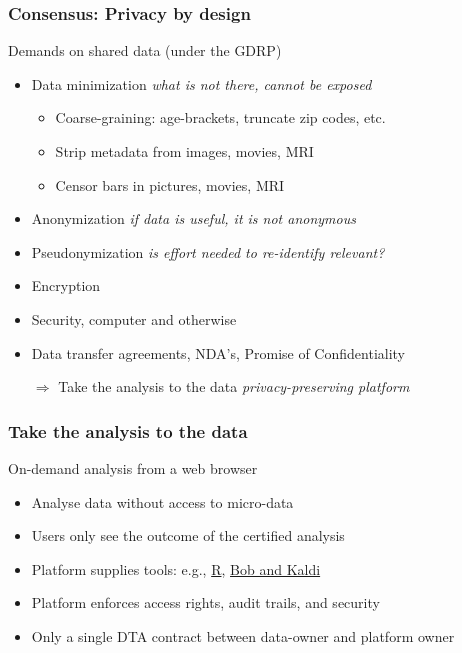 \documentclass[xcolor=dvipsnames]{beamer}
\begin{document}
\begin{frame}
	\frametitle{Consensus: Privacy by design}
	
	\begin{block}{Demands on shared data (under the GDRP)}
	\begin{itemize}
	\item Data minimization {\hspace{2cm} \small \em what is not there, cannot be exposed}
	\begin{itemize}
	\item Coarse-graining: age-brackets, truncate zip codes, etc.
	\item Strip metadata from images, movies, MRI
	\item Censor bars in pictures, movies, MRI 
	\end{itemize}
	\item Anonymization {\hspace{2.6cm} \small \em if data is useful, it is not anonymous}
	\item Pseudonymization {\hspace{2cm} \small \em is effort needed to re-identify relevant?}
	\item Encryption
	\item Security, computer and otherwise
	\item Data transfer agreements, NDA's, Promise of Confidentiality
	\item[$\Rightarrow$] {\color{Maroon}Take the analysis to the data} {\hspace{2cm} \small \em privacy-preserving platform}
	\end{itemize}
	\end{block}	

\end{frame}

\begin{frame}
	\frametitle{Take the analysis to the data}
	
	\begin{block}{On-demand analysis from a web browser}
	\begin{itemize}
	\item Analyse data without access to micro-data
	\item Users only see the outcome of the certified analysis
	\item Platform supplies tools: e.g., \href{https://www.ncbi.nlm.nih.gov/pmc/articles/PMC4276062/}{\color{blue} R}, \href{http://publications.idiap.ch/downloads/papers/2017/Cernak_INTERSPEECH_2017.pdf}{\color{blue} Bob and Kaldi} {\scriptsize\cite{cernak2017bob,DataSHIELD2014:short}}
	\item Platform enforces access rights, audit trails, and security
	\item Only a single DTA contract between data-owner and platform owner
	\end{itemize}
	\end{block}	
\end{frame}
\end{document}
